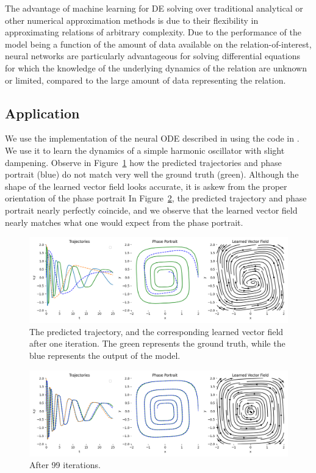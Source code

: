 \documentclass[11pt]{article}
\begin{document}
The advantage of machine learning for DE solving over traditional analytical or other numerical approximation methods is due to their flexibility in approximating relations of arbitrary complexity. Due to the performance of the model being a function of the amount of data available on the relation-of-interest, neural networks are particularly advantageous for solving differential equations for which the knowledge of the underlying dynamics of the relation are unknown or limited, compared to the large amount of data representing the relation.

\subsection{Application}

We use the implementation of the neural ODE described in \cite{chen2018neuralode} using the code in \cite{torchdiffeq}. We use it to learn the dynamics of a simple harmonic oscillator with slight dampening. Observe in Figure~\ref{fig:first_iteration} how the predicted trajectories and phase portrait (blue) do not match very well the ground truth (green). Although the shape of the learned vector field looks accurate, it is askew from the proper orientation of the phase portrait In Figure~\ref{fig:last_iteration}, the predicted trajectory and phase portrait nearly perfectly coincide, and we observe that the learned vector field nearly matches what one would expect from the phase portrait.

\begin{figure}
  \centering
  \includegraphics*[width=\linewidth]{000.png}
  \caption{The predicted trajectory, and the corresponding learned vector field after one iteration. The green represents the ground truth, while the blue represents the output of the model.}
  \label{fig:first_iteration}
\end{figure}

\begin{figure}
  \centering
  \includegraphics*[width=\linewidth]{099.png}
  \caption{After 99 iterations.}
  \label{fig:last_iteration}
\end{figure}
\end{document}
